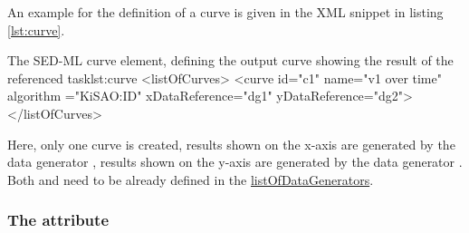 An example for the definition of a curve is given in the XML snippet in listing \ref{lst:curve}.
%
\begin{myXmlLst}{The SED-ML curve element, defining the output curve showing the result of the referenced task}{lst:curve}
<listOfCurves>
  <curve id="c1" name="v1 over time" algorithm ="KiSAO:ID" xDataReference="dg1" yDataReference="dg2">
</listOfCurves>
\end{myXmlLst}
Here, only one curve is created, results shown on the x-axis are generated by the data generator , results shown on the y-axis are generated by the data generator . Both  and  need to be already defined in the \hyperref[sec:listOfDataGenerators]{listOfDataGenerators}.

\subsubsection{The  attribute}
\label{sec:label}


